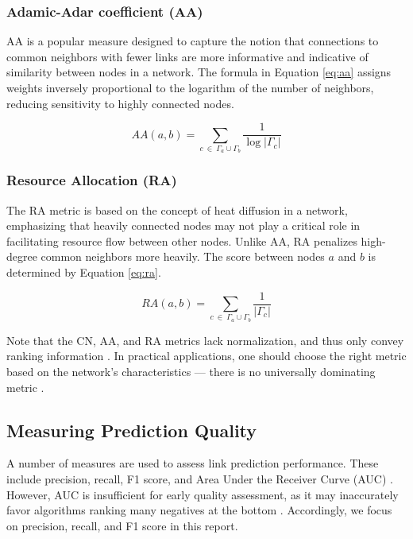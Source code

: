 \subsubsection{Adamic-Adar coefficient (AA)}

AA \cite{adamic2003friends} is a popular measure designed to capture the notion that connections to common neighbors with fewer links are more informative and indicative of similarity between nodes in a network. The formula in Equation \ref{eq:aa} assigns weights inversely proportional to the logarithm of the number of neighbors, reducing sensitivity to highly connected nodes.

\begin{equation}
\label{eq:aa}
  AA(a, b) = \sum_{c\ \in\ \Gamma_a \cup \Gamma_b} \frac{1}{\log{|\Gamma_c|}}
\end{equation}


\subsubsection{Resource Allocation (RA)}

The RA metric \cite{zhou2010solving} is based on the concept of heat diffusion in a network, emphasizing that heavily connected nodes may not play a critical role in facilitating resource flow between other nodes. Unlike AA, RA penalizes high-degree common neighbors more heavily. The score between nodes $a$ and $b$ is determined by Equation \ref{eq:ra}.

\begin{equation}
\label{eq:ra}
  RA(a, b) = \sum_{c\ \in\ \Gamma_a \cup \Gamma_b} \frac{1}{|\Gamma_c|}
\end{equation}

Note that the CN, AA, and RA metrics lack normalization, and thus only convey ranking information \cite{wang2014link}. In practical applications, one should choose the right metric based on the network's characteristics --- there is no universally dominating metric \cite{zhou2021progresses, ghasemian2020stacking, wang2014link, liben2003link}.




\subsection{Measuring Prediction Quality}

A number of measures are used to assess link prediction performance. These include precision, recall, F1 score, and Area Under the Receiver Curve (AUC) \cite{arrar2023comprehensive}. However, AUC is insufficient for early quality assessment, as it may inaccurately favor algorithms ranking many negatives at the bottom \cite{zhou2021progresses, yang2015evaluating, lichtnwalter2012link}. Accordingly, we focus on precision, recall, and F1 score in this report.


